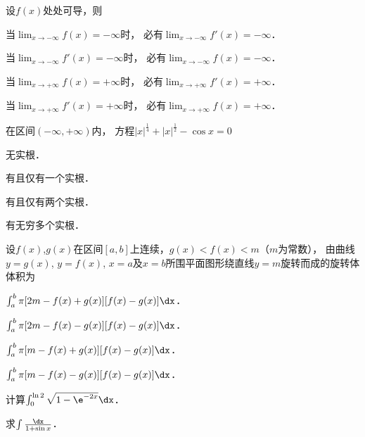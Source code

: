\documentclass[plain,noanswer,medmath]{../../template/jnuexam}
\begin{document}
\begin{problem}
设$f(x)$处处可导，则\pickout{}
\begin{abcd}
\item 当$\lim_{x \to -\infty} f(x) = -\infty$时，
      必有$\lim_{x \to -\infty} f'(x) = -\infty$．
\item 当$\lim_{x \to -\infty} f'(x) = -\infty$时，
      必有$\lim_{x \to -\infty} f(x) = -\infty$．
\item 当$\lim_{x \to +\infty} f(x) = +\infty$时，
      必有$\lim_{x \to +\infty} f'(x) = +\infty$．
\item 当$\lim_{x \to +\infty} f'(x) = +\infty$时，
      必有$\lim_{x \to +\infty} f(x) = +\infty$．
\end{abcd}
\end{problem}


\begin{problem}
在区间$(-\infty , +\infty)$内，
方程$|x|^{\frac{1}{4}} + |x|^{\frac{1}{2}} - \cos x = 0$\pickout{}
\begin{abcd}
\item 无实根．						
\item 有且仅有一个实根．
\item 有且仅有两个实根．			
\item 有无穷多个实根．
\end{abcd}
\end{problem}


\begin{problem}
设$f(x)$,$g(x)$在区间$[a,b]$上连续，$g(x) < f(x) < m$（$m$为常数），
由曲线$y = g(x)$, $y = f(x)$, $x = a$及$x = b$所围平面图形绕直线$y = m$旋转而成的旋转体体积为\pickout{}
\begin{abcd}
\item $\int_a^b \pi[2m - f(x) + g(x)][f(x) - g(x)]\dx$．
\item $\int_a^b \pi[2m - f(x) - g(x)][f(x) - g(x)]\dx$．
\item $\int_a^b \pi[m - f(x) + g(x)][f(x) - g(x)]\dx$．
\item $\int_a^b \pi[m - f(x) - g(x)][f(x) - g(x)]\dx$．
\end{abcd}
\end{problem}




\begin{problem}
计算$\int_0^{\ln 2} \sqrt{1 - \e^{-2x}} \dx$．
\end{problem}


\begin{problem}
求$\int \frac{\dx}{1 + \sin x}$．
\end{problem}
\end{document}
